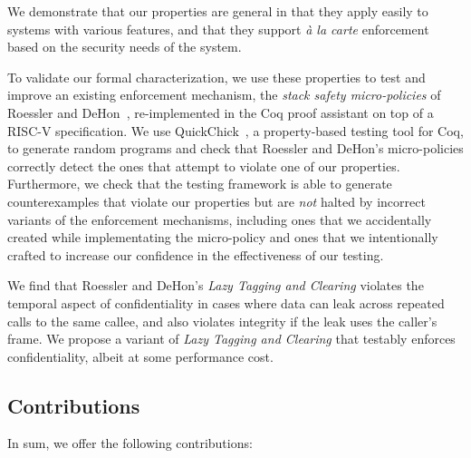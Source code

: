 We demonstrate that our properties are general in that they apply easily to systems with various
features, and that they support {\it \`a la carte} enforcement based on the security needs of the
system.

To validate our formal characterization, we use these
properties to test and improve an existing enforcement mechanism, the
{\em stack safety micro-policies} of Roessler and DeHon~\cite{DBLP:conf/sp/RoesslerD18}, re-implemented
in the Coq proof assistant on top of a  RISC-V specification.  We
use QuickChick~\cite{Denes:VSL2014,Pierce:SF4}, a property-based testing
tool for Coq, to generate random programs and check
that Roessler and DeHon's micro-policies correctly detect the ones that
attempt to violate one of our properties. Furthermore, we
check that the testing framework is able to generate counterexamples
that violate our properties but are \emph{not} halted by incorrect
variants of the enforcement mechanisms, including ones that we accidentally created
while implementating the micro-policy and ones that we
intentionally crafted to increase our confidence in the effectiveness
of our testing.
%

We find that Roessler and DeHon's \emph{Lazy Tagging and Clearing}
violates the temporal aspect of confidentiality in
cases where data can leak across repeated calls to the same callee,
and also violates integrity if the leak uses the caller's frame. We
propose a variant of {\em Lazy Tagging and Clearing} that testably enforces
confidentiality, albeit at some performance cost.
%

\subsection{Contributions}

In sum, we offer the following contributions:

